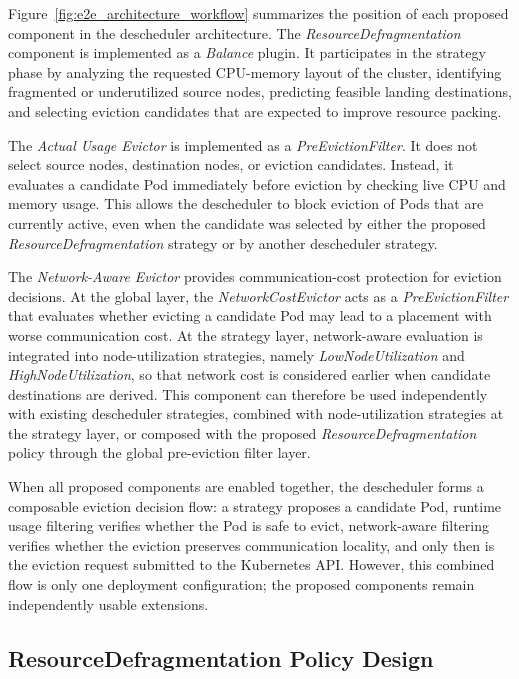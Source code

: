 Figure~\ref{fig:e2e_architecture_workflow} summarizes the position of each proposed component in the descheduler architecture. The \textit{ResourceDefragmentation} component is implemented as a \textit{Balance} plugin. It participates in the strategy phase by analyzing the requested CPU-memory layout of the cluster, identifying fragmented or underutilized source nodes, predicting feasible landing destinations, and selecting eviction candidates that are expected to improve resource packing.

The \textit{Actual Usage Evictor} is implemented as a \textit{PreEvictionFilter}. It does not select source nodes, destination nodes, or eviction candidates. Instead, it evaluates a candidate Pod immediately before eviction by checking live CPU and memory usage. This allows the descheduler to block eviction of Pods that are currently active, even when the candidate was selected by either the proposed \textit{ResourceDefragmentation} strategy or by another descheduler strategy.

The \textit{Network-Aware Evictor} provides communication-cost protection for eviction decisions. At the global layer, the \textit{NetworkCostEvictor} acts as a \textit{PreEvictionFilter} that evaluates whether evicting a candidate Pod may lead to a placement with worse communication cost. At the strategy layer, network-aware evaluation is integrated into node-utilization strategies, namely \textit{LowNodeUtilization} and \textit{HighNodeUtilization}, so that network cost is considered earlier when candidate destinations are derived. This component can therefore be used independently with existing descheduler strategies, combined with node-utilization strategies at the strategy layer, or composed with the proposed \textit{ResourceDefragmentation} policy through the global pre-eviction filter layer.

When all proposed components are enabled together, the descheduler forms a composable eviction decision flow: a strategy proposes a candidate Pod, runtime usage filtering verifies whether the Pod is safe to evict, network-aware filtering verifies whether the eviction preserves communication locality, and only then is the eviction request submitted to the Kubernetes API. However, this combined flow is only one deployment configuration; the proposed components remain independently usable extensions.

\subsection{ResourceDefragmentation Policy Design}
\label{sec:imbalanceindex_design}

